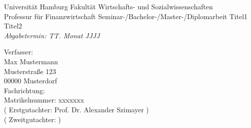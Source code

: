 \begin{titlepage}
  \begin{center}
    \vspace*{\fill}
    {\Large Universität Hamburg}
    \vfill
    Fakultät Wirtschafts- und Sozialwissenschaften\\
    Professur für Finanzwirtschaft
    \vfill
    Seminar-/Bachelor-/Master-/Diplomarbeit
    \vfill
    {\Large Titel1 }\\ %
    \vspace*{-1.2cm}
    \vfill
    {\Large Titel2}\\ %
    \vfill
    \textit{Abgabetermin: TT. Monat JJJJ}
  \end{center}
  \vfill
  Verfasser:\\
  Max Mustermann \\
  Musterstraße 123 \\
  00000 Musterdorf \\
  Fachrichtung:  \\
  Matrikelnummer: xxxxxxx\\[2mm]
  ( Erstgutachter: Prof. Dr. Alexander Szimayer ) \\ 					%
  ( Zweitgutachter: )																				 	%
\end{titlepage}
